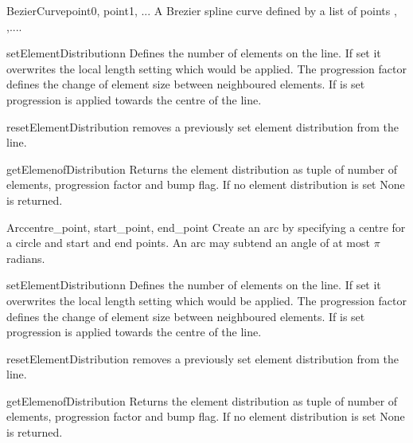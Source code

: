 \begin{classdesc}{BezierCurve}{point0, point1, ...}
A Brezier spline curve defined by a list of points , ,....
\end{classdesc}
\begin{methoddesc}[BezierCurve]{setElementDistribution}{n}
Defines the number of elements on the line. If set it overwrites the local length setting which would be applied. The progression factor  defines the change of element size between neighboured elements. If  is set
progression is applied towards the centre of the line.
\end{methoddesc}
\begin{methoddesc}[BezierCurve]{resetElementDistribution}{}
removes a previously set element distribution from the line.
\end{methoddesc}
\begin{methoddesc}[BezierCurve]{getElemenofDistribution}{}
Returns the element distribution as tuple of
number of elements, progression factor and bump flag. If
no element distribution is set None is returned.
\end{methoddesc}

\begin{classdesc}{Arc}{centre_point, start_point, end_point}
Create an arc by specifying a centre for a circle and start and end points. An arc may subtend an angle of at most $\pi$ radians.
\end{classdesc}
\begin{methoddesc}[Arc]{setElementDistribution}{n}
Defines the number of elements on the line. If set it overwrites the local length setting which would be applied. The progression factor  defines the change of element size between neighboured elements. If  is set
progression is applied towards the centre of the line.
\end{methoddesc}
\begin{methoddesc}[Arc]{resetElementDistribution}{}
removes a previously set element distribution from the line.
\end{methoddesc}
\begin{methoddesc}[Arc]{getElemenofDistribution}{}
Returns the element distribution as tuple of
number of elements, progression factor and bump flag. If
no element distribution is set None is returned.
\end{methoddesc}

